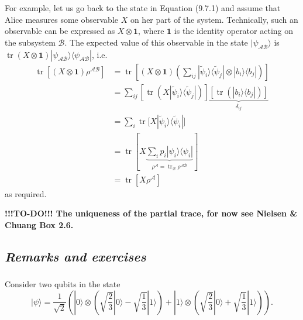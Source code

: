 \documentclass[fleqn]{article}
\begin{document}
For example, let us go back to the state in Equation (9.7.1) and assume that Alice measures some observable \(X\) on her part of the system.
Technically, such an observable can be expressed as \(X\otimes \mathbf{1}\), where \(\mathbf{1}\) is the identity operator acting on the subsystem \(\mathcal{B}\).
The expected value of this observable in the state \(|\psi_{\mathcal{AB}}\rangle\) is \(\operatorname{tr}(X\otimes\mathbf{1})|\psi_{\mathcal{AB}}\rangle\langle\psi_{\mathcal{AB}}|\), i.e.
\[
  \begin{aligned}
    \operatorname{tr}[(X\otimes \mathbf{1}) \rho^{\mathcal{AB}}]
    &= \operatorname{tr}\left[
        (X\otimes\mathbf{1}) \left(
          \sum_{ij} |\widetilde\psi_i\rangle\langle\widetilde\psi_j| \otimes |b_i\rangle\langle b_j|
        \right)
      \right]
  \\&= \sum_{ij} \left[
        \operatorname{tr}\left(X |\widetilde\psi_i\rangle\langle\widetilde\psi_j|\right)
      \right]
      \underbrace{\left[\operatorname{tr}\left(|b_i\rangle\langle b_j|\right)\right]}_{\delta_{ij}}
  \\&= \sum_i \operatorname{tr}\big[X |\widetilde\psi_i\rangle\langle\widetilde\psi_i|\big]
  \\&= \operatorname{tr}\left[
      X \underbrace{\sum_i p_i|\psi_i\rangle\langle\psi_i|}_{\rho^{\mathcal{A}} = \operatorname{tr}_{\mathcal{B}}\rho^{\mathcal{AB}}}
    \right]
  \\&= \operatorname{tr}[X\rho^{\mathcal{A}}]
  \end{aligned}
\]
as required.

\textbf{!!!TO-DO!!! The uniqueness of the partial trace, for now see Nielsen \& Chuang Box 2.6.}

\hypertarget{remarks-and-exercises-5}{%
\subsection{\texorpdfstring{\emph{Remarks and exercises}}{Remarks and exercises}}\label{remarks-and-exercises-5}}

\hypertarget{exercise31}{%
\subsubsection{}\label{exercise31}}

Consider two qubits in the state
\[
  |\psi\rangle =
  \frac{1}{\sqrt2}\left(
    |0\rangle\otimes\left(
      \sqrt{\frac23}|0\rangle
      - \sqrt{\frac13}|1\rangle
    \right)
    + |1\rangle\otimes\left(
      \sqrt{\frac23}|0\rangle
      + \sqrt{\frac13}|1\rangle
    \right)
  \right).
\]
\end{document}
